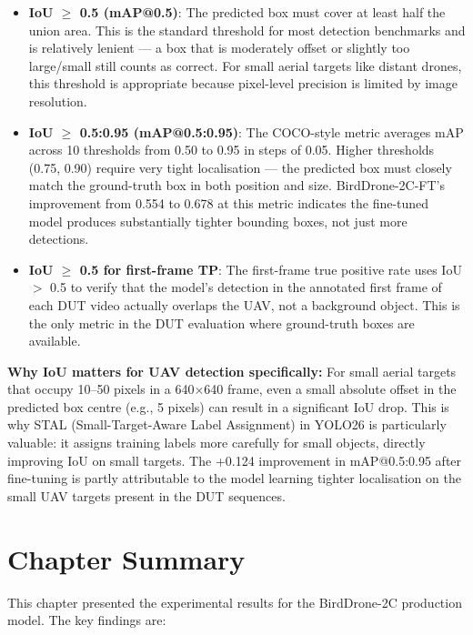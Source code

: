 \documentclass[12pt,a4paper]{report}
\begin{document}
\begin{itemize}
  \item \textbf{IoU $\geq$ 0.5 (mAP@0.5)}: The predicted box must cover at
        least half the union area. This is the standard threshold for most
        detection benchmarks and is relatively lenient --- a box that is
        moderately offset or slightly too large/small still counts as correct.
        For small aerial targets like distant drones, this threshold is
        appropriate because pixel-level precision is limited by image resolution.

  \item \textbf{IoU $\geq$ 0.5:0.95 (mAP@0.5:0.95)}: The COCO-style metric
        averages mAP across 10 thresholds from 0.50 to 0.95 in steps of 0.05.
        Higher thresholds (0.75, 0.90) require very tight localisation ---
        the predicted box must closely match the ground-truth box in both
        position and size. BirdDrone-2C-FT's improvement from 0.554 to 0.678
        at this metric indicates the fine-tuned model produces substantially
        tighter bounding boxes, not just more detections.

  \item \textbf{IoU $\geq$ 0.5 for first-frame TP}: The first-frame true
        positive rate uses IoU $>$ 0.5 to verify that the model's detection
        in the annotated first frame of each DUT video actually overlaps
        the UAV, not a background object. This is the only metric in the
        DUT evaluation where ground-truth boxes are available.
\end{itemize}

\textbf{Why IoU matters for UAV detection specifically:}
For small aerial targets that occupy 10--50 pixels in a 640$\times$640 frame,
even a small absolute offset in the predicted box centre (e.g., 5 pixels)
can result in a significant IoU drop. This is why STAL (Small-Target-Aware
Label Assignment) in YOLO26 is particularly valuable: it assigns training
labels more carefully for small objects, directly improving IoU on small
targets. The +0.124 improvement in mAP@0.5:0.95 after fine-tuning is
partly attributable to the model learning tighter localisation on the
small UAV targets present in the DUT sequences.

\section{Chapter Summary}

This chapter presented the experimental results for the BirdDrone-2C
production model. The key findings are:
\end{document}
